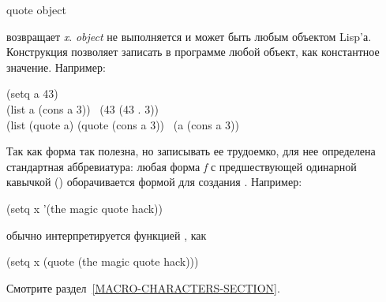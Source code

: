 \begin{defspec}
quote object

 возвращает \emph{x}.
\emph{object} не выполняется и может быть любым объектом Lisp'а.
Конструкция позволяет записать в программе любой объект, как константное
значение.
Например:
\begin{lisp}
(setq a 43) \\
(list a (cons a 3)) \EV\ (43 (43 . 3)) \\
(list (quote a) (quote (cons a 3)) \EV\ (a (cons a 3))
\end{lisp}
Так как  форма так полезна, но записывать ее трудоемко, для нее
определена стандартная аббревиатура:
любая форма \emph{f} с предшествующей одинарной кавычкой ()
оборачивается формой  для создания .
Например:
\begin{lisp}
(setq x '(the magic quote hack))
\end{lisp}
обычно интерпретируется функцией , как
\begin{lisp}
(setq x (quote (the magic quote hack)))
\end{lisp}
Смотрите раздел~\ref{MACRO-CHARACTERS-SECTION}.
\end{defspec}

